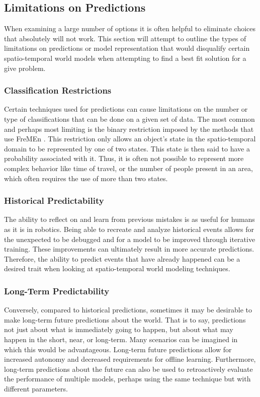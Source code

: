   \subsection { Limitations on Predictions }
  When examining a large number of options it is often helpful to eliminate
  choices that absolutely will not work. This section will attempt to outline
  the types of limitations on predictions or model representation that
  would disqualify certain spatio-temporal world
  models when attempting to find a best fit solution for a give problem. \\


  \subsubsection{ Classification Restrictions }
  Certain techniques used for predictions can cause limitations on the number
  or type of classifications that can be done on a given set of data. The most common
  and perhaps most limiting is the binary restriction imposed by the
  methods that use FreMEn \cite{Hawes2017, Krajnik2015}. This restriction only
  allows an object's state in the spatio-temporal domain to be represented by one of two
  states. This state is then said to have a probability associated with it.
  Thus, it is often not possible to represent more complex behavior like time
  of travel, or the number of people present in an area, which often requires the use of
  more than two states. \\

  \subsubsection{ Historical Predictability }
  The ability to reflect on and learn from previous mistakes is as useful for
  humans as it is in robotics. Being able to recreate and analyze historical
  events allows for the unexpected to be debugged and for
  a model to be improved through iterative training. These improvements can ultimately result
  in more accurate predictions. Therefore, the ability to predict events that
  have already happened can be a desired trait when looking at
  spatio-temporal world modeling techniques. \\

  \subsubsection{ Long-Term Predictability }
  Conversely, compared to historical predictions, sometimes it may be desirable
  to make long-term future predictions about the world. That is to say, predictions
  not just about what is immediately going to happen, but about what may happen
  in the short, near, or long-term. Many scenarios can be imagined
  in which this would be advantageous. Long-term future predictions allow for
  increased autonomy and decreased requirements for offline learning.
  Furthermore, long-term predictions about the future can also be used to
  retroactively evaluate the performance of multiple models, perhaps using
  the same technique but with different parameters. \\


